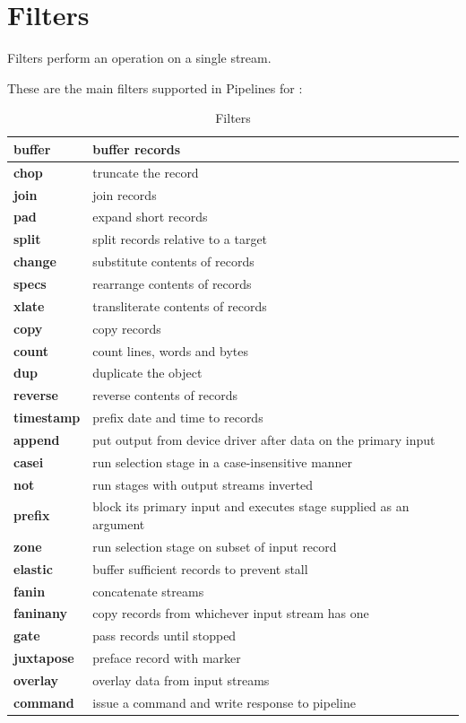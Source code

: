 \section{Filters}

Filters perform an operation on a single stream.

These are the main filters supported in Pipelines for \nr{}:

\begin{longtable}[l]{|l|p{10cm}|l|}
\caption{ Filters } \\
\hline
\textbf{buffer}&buffer records \\
\hline
\textbf{chop}&truncate the record \\
\hline
\textbf{join}&join records \\
\hline
\textbf{pad}&expand short records \\
\hline
\textbf{split}&split records relative to a target \\
\hline
\textbf{change}&substitute contents of records \\
\hline
\textbf{specs}&rearrange contents of records \\
\hline
\textbf{xlate}&transliterate contents of records \\
\hline
\textbf{copy}&copy records \\
\hline
\textbf{count}&count lines, words and bytes \\
\hline
\textbf{dup}&duplicate the object \\
\hline
\textbf{reverse}&reverse contents of records \\
\hline
\textbf{timestamp}&prefix date and time to records \\
\hline
\textbf{append}&put output from device driver after data on the primary input \\
\hline
\textbf{casei}&run selection stage in a case-insensitive manner \\
\hline
\textbf{not}&run stages with output streams inverted \\
\hline
\textbf{prefix}&block its primary input and executes stage supplied as an argument \\
\hline
\textbf{zone}&run selection stage on subset of input record \\
\hline
\textbf{elastic}&buffer sufficient records to prevent stall \\
\hline
\textbf{fanin}&concatenate streams \\
\hline
\textbf{faninany}&copy records from whichever input stream has one \\
\hline
\textbf{gate}&pass records until stopped \\
\hline
\textbf{juxtapose}&preface record with marker \\
\hline
\textbf{overlay}&overlay data from input streams \\
\hline
\textbf{command}&issue a command and write response to pipeline \\
\hline
\end{longtable}



